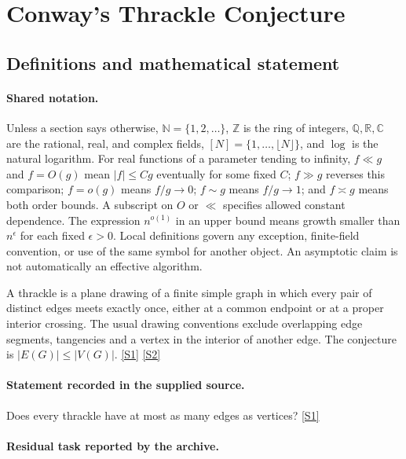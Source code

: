 \documentclass[11pt,a4paper]{article}
\newcommand{\N}{\mathbb{N}}
\newcommand{\Z}{\mathbb{Z}}
\newcommand{\Q}{\mathbb{Q}}
\newcommand{\R}{\mathbb{R}}
\newcommand{\C}{\mathbb{C}}
\newcommand{\sref}[2]{\hyperlink{source:#1:#2}{[S#2]}}
\begin{document}
\section{Conway’s Thrackle Conjecture}\label{statement}


\subsection{Definitions and mathematical statement}

\paragraph{Shared notation.}Unless a section says otherwise, $\N=\{1,2,\ldots\}$,
$\Z$ is the ring of integers, $\Q,\R,\C$ are the rational, real, and complex
fields, $[N]=\{1,\ldots,\lfloor N\rfloor\}$, and $\log$ is the natural
logarithm. For real functions of a parameter tending to infinity,
$f\ll g$ and $f=O(g)$ mean $|f|\leq Cg$ eventually for some fixed $C$;
$f\gg g$ reverses this comparison; $f=o(g)$ means $f/g\to0$;
$f\sim g$ means $f/g\to1$; and $f\asymp g$ means both order bounds.
A subscript on $O$ or $\ll$ specifies allowed constant dependence.
The expression $n^{o(1)}$ in an upper bound means growth smaller than
$n^\epsilon$ for each fixed $\epsilon>0$. Local definitions govern any
exception, finite-field convention, or use of the same symbol for another
object. An asymptotic claim is not automatically an effective algorithm.



A thrackle is a plane drawing of a finite simple graph in which every pair of distinct edges meets exactly once, either at a common endpoint or at a proper interior crossing. The usual drawing conventions exclude overlapping edge segments, tangencies and a vertex in the interior of another edge. The conjecture is $|E(G)|\leq|V(G)|$. \sref{statement}{1} \sref{statement}{2}

\paragraph{Statement recorded in the supplied source.}
Does every thrackle have at most as many edges as vertices? \sref{statement}{1}

\paragraph{Residual task reported by the archive.}
\end{document}
